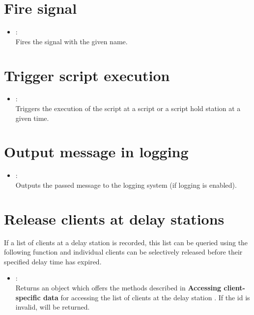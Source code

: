 \section{Fire signal}

\begin{itemize}

\item
{}:\\
Fires the signal with the given name.

\end{itemize}

\section{Trigger script execution}

\begin{itemize}

\item
{}:\\
Triggers the execution of the script at a script or a script hold station at a given time.

\end{itemize}

\section{Output message in logging}

\begin{itemize}

\item
{}:\\
Outputs the passed message to the logging system (if logging is enabled).

\end{itemize}

\section{Release clients at delay stations}

If a list of clients at a delay station is recorded, this list can be queried using the
following function and individual clients can be selectively released before their
specified delay time has expired.

\begin{itemize}

\item
{}:\\
Returns an object which offers the methods described in \textbf{Accessing client-specific data}
for accessing the list of clients at the delay station . If the id is invalid, 
will be returned.

\end{itemize}

